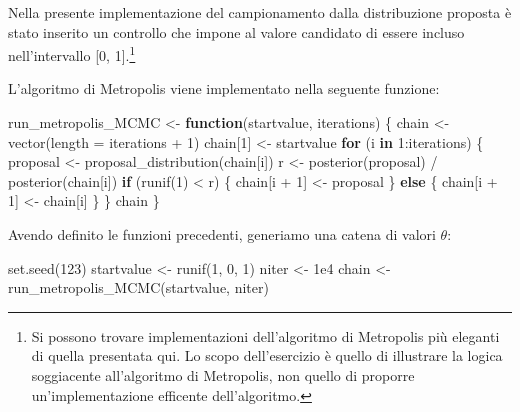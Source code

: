 \documentclass[
  11pt,
]{krantz}
\makeatletter
\newenvironment{Shaded}{\begin{snugshade}}{\end{snugshade}}
\newcommand{\AttributeTok}[1]{\textcolor[rgb]{0.61,0.61,0.61}{#1}}
\newcommand{\ControlFlowTok}[1]{\textcolor[rgb]{0.27,0.27,0.27}{\textbf{#1}}}
\newcommand{\DecValTok}[1]{\textcolor[rgb]{0.06,0.06,0.06}{#1}}
\newcommand{\FloatTok}[1]{\textcolor[rgb]{0.06,0.06,0.06}{#1}}
\newcommand{\FunctionTok}[1]{\textcolor[rgb]{0,0,0}{#1}}
\newcommand{\NormalTok}[1]{#1}
\newcommand{\OtherTok}[1]{\textcolor[rgb]{0.37,0.37,0.37}{#1}}
\newcommand{\SpecialCharTok}[1]{\textcolor[rgb]{0,0,0}{#1}}
\newenvironment{kframe}{%
\medskip{}
\setlength{\fboxsep}{.8em}
 \def\at@end@of@kframe{}%
 \ifinner\ifhmode%
  \def\at@end@of@kframe{\end{minipage}}%
  \begin{minipage}{\columnwidth}%
 \fi\fi%
 \def\FrameCommand##1{\hskip\@totalleftmargin \hskip-\fboxsep
 \colorbox{shadecolor}{##1}\hskip-\fboxsep
     \hskip-\linewidth \hskip-\@totalleftmargin \hskip\columnwidth}%
 \MakeFramed {\advance\hsize-\width
   \@totalleftmargin\z@ \linewidth\hsize
   \@setminipage}}%
 {\par\unskip\endMakeFramed%
 \at@end@of@kframe}
\renewenvironment{Shaded}{\begin{kframe}}{\end{kframe}}
\theoremstyle{definition}
\theoremstyle{definition}
\theoremstyle{definition}
\theoremstyle{definition}
\theoremstyle{remark}
\makeatother
\begin{document}
Nella presente implementazione del campionamento dalla distribuzione proposta è stato inserito un controllo che impone al valore candidato di essere incluso nell'intervallo {[}0, 1{]}.\footnote{Si possono trovare implementazioni dell'algoritmo di Metropolis più eleganti di quella presentata qui. Lo scopo dell'esercizio è quello di illustrare la logica soggiacente all'algoritmo di Metropolis, non quello di proporre un'implementazione efficente dell'algoritmo.}

L'algoritmo di Metropolis viene implementato nella seguente funzione:

\begin{Shaded}
\begin{Highlighting}[]
\NormalTok{run\_metropolis\_MCMC }\OtherTok{\textless{}{-}} \ControlFlowTok{function}\NormalTok{(startvalue, iterations) \{}
\NormalTok{  chain }\OtherTok{\textless{}{-}} \FunctionTok{vector}\NormalTok{(}\AttributeTok{length =}\NormalTok{ iterations }\SpecialCharTok{+} \DecValTok{1}\NormalTok{)}
\NormalTok{  chain[}\DecValTok{1}\NormalTok{] }\OtherTok{\textless{}{-}}\NormalTok{ startvalue}
  \ControlFlowTok{for}\NormalTok{ (i }\ControlFlowTok{in} \DecValTok{1}\SpecialCharTok{:}\NormalTok{iterations) \{}
\NormalTok{    proposal }\OtherTok{\textless{}{-}} \FunctionTok{proposal\_distribution}\NormalTok{(chain[i])}
\NormalTok{    r }\OtherTok{\textless{}{-}} \FunctionTok{posterior}\NormalTok{(proposal) }\SpecialCharTok{/} \FunctionTok{posterior}\NormalTok{(chain[i])}
    \ControlFlowTok{if}\NormalTok{ (}\FunctionTok{runif}\NormalTok{(}\DecValTok{1}\NormalTok{) }\SpecialCharTok{\textless{}}\NormalTok{ r) \{}
\NormalTok{      chain[i }\SpecialCharTok{+} \DecValTok{1}\NormalTok{] }\OtherTok{\textless{}{-}}\NormalTok{ proposal}
\NormalTok{    \} }\ControlFlowTok{else}\NormalTok{ \{}
\NormalTok{      chain[i }\SpecialCharTok{+} \DecValTok{1}\NormalTok{] }\OtherTok{\textless{}{-}}\NormalTok{ chain[i]}
\NormalTok{    \}}
\NormalTok{  \}}
\NormalTok{  chain}
\NormalTok{\}}
\end{Highlighting}
\end{Shaded}

Avendo definito le funzioni precedenti, generiamo una catena di valori \(\theta\):

\begin{Shaded}
\begin{Highlighting}[]
\FunctionTok{set.seed}\NormalTok{(}\DecValTok{123}\NormalTok{)}
\NormalTok{startvalue }\OtherTok{\textless{}{-}} \FunctionTok{runif}\NormalTok{(}\DecValTok{1}\NormalTok{, }\DecValTok{0}\NormalTok{, }\DecValTok{1}\NormalTok{)}
\NormalTok{niter }\OtherTok{\textless{}{-}} \FloatTok{1e4}
\NormalTok{chain }\OtherTok{\textless{}{-}} \FunctionTok{run\_metropolis\_MCMC}\NormalTok{(startvalue, niter)}
\end{Highlighting}
\end{Shaded}
\end{document}
